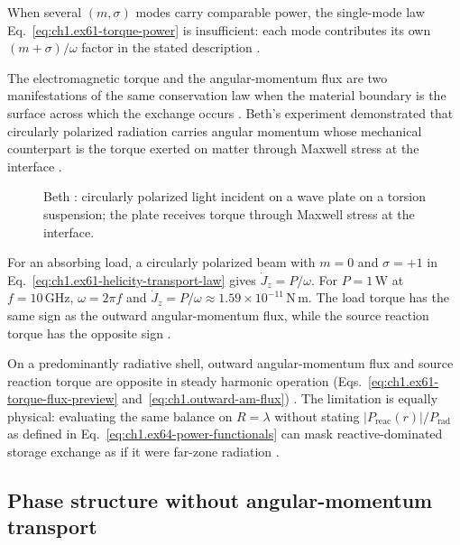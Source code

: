 When several \((m,\sigma)\) modes carry comparable power, the single-mode law
Eq.~\eqref{eq:ch1.ex61-torque-power} is insufficient: each mode contributes its own
\((m+\sigma)/\omega\) factor in the stated description \cite{stratton1941}.

The electromagnetic torque and the angular-momentum flux are two manifestations of the same conservation law when the material boundary is the surface across which the exchange occurs \cite{beth1936}. Beth's experiment demonstrated that circularly polarized radiation carries angular momentum whose mechanical counterpart is the torque exerted on matter through Maxwell stress at the interface \cite{beth1936}.

\begin{figure}[t]
\centering
\VolIPhysFig{\VolIPhysBethSchematic}
\caption{Beth \cite{beth1936}: circularly polarized light incident on a wave plate on a torsion suspension; the plate receives torque through Maxwell stress at the interface.}
\label{fig:ch1.beth-schematic}
\end{figure}

\begin{example}
\label{ex:ch1.beth-torque}
For an absorbing load, a circularly polarized beam with $m=0$ and $\sigma=+1$ in Eq.~\eqref{eq:ch1.ex61-helicity-transport-law} gives $\dot J_z=P/\omega$. For $P=1\,\mathrm{W}$ at $f=10\,\mathrm{GHz}$, $\omega=2\pi f$ and $\dot J_z=P/\omega\approx1.59\times10^{-11}\,\mathrm{N\,m}$. The load torque has the same sign as the outward angular-momentum flux, while the source reaction torque has the opposite sign \cite{beth1936,stratton1941}.
\end{example}

On a predominantly radiative shell, outward angular-momentum flux and source reaction torque are opposite in steady harmonic operation (Eqs.~\eqref{eq:ch1.ex61-torque-flux-preview} and~\eqref{eq:ch1.outward-am-flux}) \cite{beth1936}. The limitation is equally physical: evaluating the same balance on
\(R=\lambda\) without stating \(|P_{\mathrm{reac}}(r)|/P_{\mathrm{rad}}\) as defined in Eq.~\eqref{eq:ch1.ex64-power-functionals} can
mask reactive-dominated storage exchange as if it were far-zone radiation \cite{stratton1941}.

\subsection{Phase structure without angular-momentum transport}
\label{sec:ch01.6.2}

